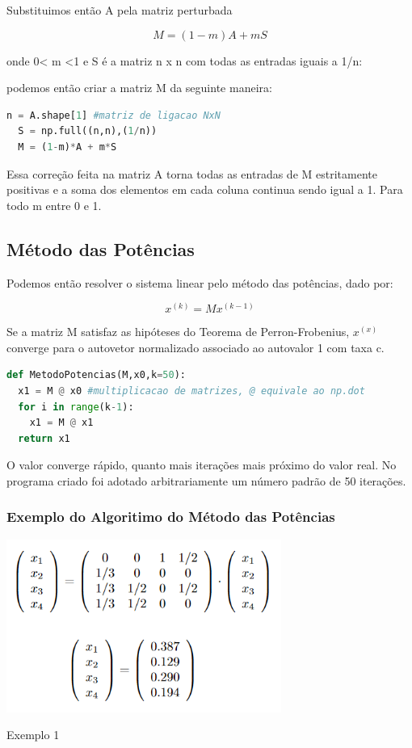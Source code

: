\documentclass[a4paper, 12pt]{article}
\begin{document}
Substituimos então A pela matriz perturbada 

$$M = (1-m)A +mS$$

onde 0< m <1 e S é a matriz n x n com todas as entradas iguais a 1/n:

podemos então criar a matriz M da seguinte maneira:

\begin{lstlisting}[language=Python, caption=Matriz M]
  n = A.shape[1] #matriz de ligacao NxN
  S = np.full((n,n),(1/n))
  M = (1-m)*A + m*S
\end{lstlisting}

Essa correção feita na matriz A torna todas as entradas de M estritamente positivas e a soma dos elementos em cada coluna continua sendo igual a 1. Para todo m entre 0 e 1.

\subsection{Método das Potências}
Podemos então resolver o sistema linear pelo método das potências\citep{anton}, dado por:

$$x^{(k)} = Mx^{(k-1)}$$

Se a matriz M satisfaz as hipóteses do Teorema de Perron-Frobenius, $x^{(x)}$ converge para o autovetor normalizado associado ao autovalor 1 com taxa c.

\begin{lstlisting}[language=Python, caption=Método das Potências]
def MetodoPotencias(M,x0,k=50):
  x1 = M @ x0 #multiplicacao de matrizes, @ equivale ao np.dot
  for i in range(k-1):
    x1 = M @ x1
  return x1
\end{lstlisting}

O valor converge rápido, quanto mais iterações mais próximo do valor real. No programa criado foi adotado arbitrariamente um número padrão de 50 iterações.

\subsubsection{Exemplo do Algoritimo do Método das Potências}

\begin{center}
    \includegraphics[width=9cm]{Exemplo_pot.PNG}
    
    Exemplo 1
\end{center}
\end{document}
